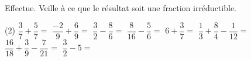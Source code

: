 %
%
Effectue. Veille à ce que le résultat soit une fraction irréductible.
  \begin{tasks} (2)
    \task $\dfrac{3}{7} + \dfrac{5}{7}=$
    \task $\dfrac{-2}{9} + \dfrac{6}{9}=$
    \task $\dfrac{3}{2} - \dfrac{8}{6}=$
    \task $\dfrac{8}{16} - \dfrac{5}{6}=$
    \task $6 + \dfrac{3}{7}=$
    \task $\dfrac{1}{3} + \dfrac{8}{4} - \dfrac{1}{12}=$
    \task $\dfrac{16}{18} + \dfrac{3}{9} - \dfrac{7}{21}=$
    \task $\dfrac{3}{2} - 5=$
  \end{tasks}
